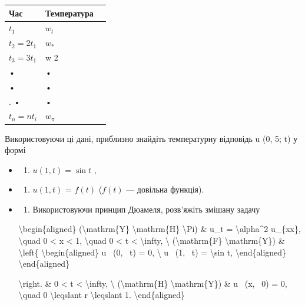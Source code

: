 \documentclass[
]{article}
\newcounter{none} %
\providecommand{\tightlist}{%
  \setlength{\itemsep}{0pt}\setlength{\parskip}{0pt}}
\begin{document}
{{{\def\LTcaptype{none} %
\begin{longtable}[]{@{}lll@{}}
\toprule\noalign{}
Час & Температура & \\
\midrule\noalign{}
\endhead
\bottomrule\noalign{}
\endlastfoot
\(t_1\) & \(w_t\) & \\
\(t_2 = 2t_1\) & \(w_*\) & \\
\(t_3 = 3t_1\) & w 2 & \\
• & • & \\
• & • & \\
. • & • & \\
\(t_n = nt_i\) & \(w_{\pi}\) & \\
\end{longtable}
}

Використовуючи ці дані, приблизно знайдіть температурну відповідь u (0,
5; t) у формі

\begin{itemize}
\item
  \begin{enumerate}
  \def\labelenumi{\alph{enumi})}
  \tightlist
  \item
    \(u(1, t) = \sin t\) ,
  \end{enumerate}
\item
  \begin{enumerate}
  \def\labelenumi{\alph{enumi})}
  \setcounter{enumi}{1}
  \tightlist
  \item
    \(u(1, t)\) = \(f(t)\) (\(f(t)\) --- довільна функція).
  \end{enumerate}
\item
  \begin{enumerate}
  \def\labelenumi{\arabic{enumi}.}
  \setcounter{enumi}{3}
  \tightlist
  \item
    Використовуючи принцип Дюамеля, розв'яжіть змішану задачу
  \end{enumerate}

  \textbackslash begin\{aligned\} (\textbackslash mathrm\{Y\}
  \textbackslash mathrm\{H\} \textbackslash Pi) \& u\_t =
  \textbackslash alpha\^{}2 u\_\{xx\}, \textbackslash quad 0 \textless{}
  x \textless{} 1, \textbackslash quad 0 \textless{} t \textless{}
  \textbackslash infty, \textbackslash{} (\textbackslash mathrm\{F\}
  \textbackslash mathrm\{Y\}) \& \textbackslash left\{
  \textbackslash begin\{aligned\} u ~(0, ~t) = 0, \textbackslash{} u
  ~(1, ~t) = \textbackslash sin t, \textbackslash end\{aligned\}
  \textbackslash end\{aligned\}

  \textbackslash right. \& 0 \textless{} t \textless{}
  \textbackslash infty, \textbackslash{} (\textbackslash mathrm\{H\}
  \textbackslash mathrm\{Y\}) \& u ~(x, ~0) = 0, \textbackslash quad 0
  \textbackslash leqslant r \textbackslash leqslant 1.
  \textbackslash end\{aligned\}
\end{itemize}

}}
\end{document}
